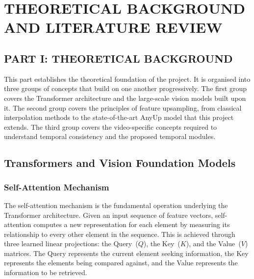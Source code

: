 \chapter{THEORETICAL BACKGROUND AND LITERATURE REVIEW}

\section*{PART I: THEORETICAL BACKGROUND}

This part establishes the theoretical foundation of the project.
It is organised into three groups of concepts that build on one
another progressively.
The first group covers the Transformer architecture and the
large-scale vision models built upon it.
The second group covers the principles of feature upsampling,
from classical interpolation methods to the state-of-the-art
AnyUp model that this project extends.
The third group covers the video-specific concepts required to
understand temporal consistency and the proposed temporal modules.

\section{Transformers and Vision Foundation Models}

\subsection{Self-Attention Mechanism}

The self-attention mechanism is the fundamental operation
underlying the Transformer architecture.
Given an input sequence of feature vectors, self-attention
computes a new representation for each element by measuring its
relationship to every other element in the sequence.
This is achieved through three learned linear projections:
the Query~($Q$), the Key~($K$), and the Value~($V$) matrices.
The Query represents the current element seeking information,
the Key represents the elements being compared against, and the
Value represents the information to be retrieved.


